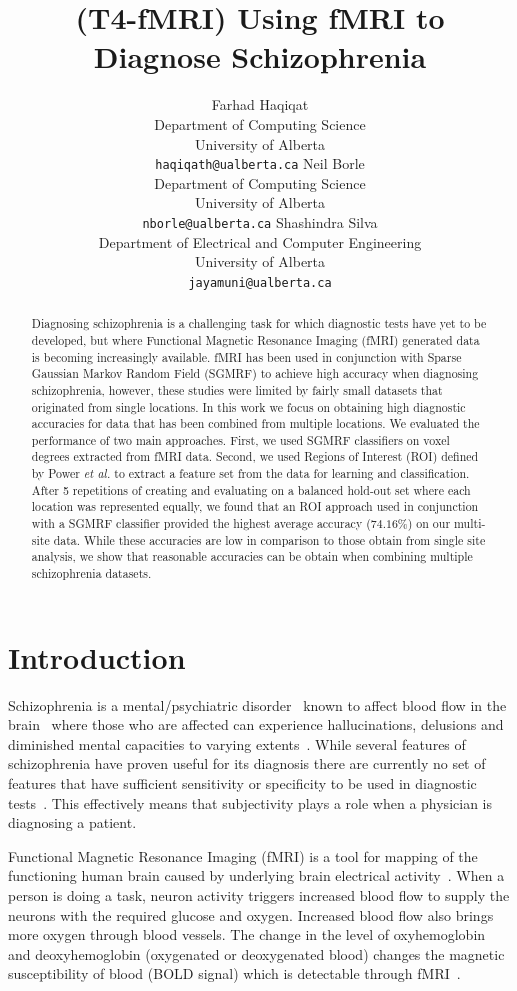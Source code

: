 \documentclass{article} %
\title{(T4-fMRI) Using fMRI to Diagnose Schizophrenia}
\author{
Farhad Haqiqat\\
Department of Computing Science\\
University of Alberta\\
\texttt{haqiqath@ualberta.ca} 
\And 
Neil Borle\\
Department of Computing Science\\
University of Alberta\\
\texttt{nborle@ualberta.ca}
\And 
Shashindra Silva\\
Department of Electrical and Computer Engineering\\
University of Alberta\\
\texttt{jayamuni@ualberta.ca}  
}
\begin{document}
	\maketitle

\begin{abstract}
Diagnosing schizophrenia is a challenging task for which diagnostic tests
have yet to be developed, but where Functional Magnetic Resonance Imaging 
(fMRI) generated data is becoming increasingly available.
fMRI has been used in conjunction with Sparse 
Gaussian Markov Random Field (SGMRF) to achieve high accuracy when diagnosing
schizophrenia, however, these studies were limited by fairly small datasets
that originated from single locations. In this work we focus on obtaining
high diagnostic accuracies for data that has been combined from multiple
locations. We evaluated the performance of two main approaches. First, we 
used SGMRF classifiers on voxel degrees extracted from fMRI data. Second, we 
used Regions of Interest (ROI) defined by Power \emph{et al.} to extract a 
feature set from the data for learning and classification. 
After 5 repetitions of creating and evaluating on a balanced hold-out set where 
each location was represented equally, we found that an ROI approach used in 
conjunction with a SGMRF classifier provided the highest average accuracy 
($74.16\%$) on our multi-site 
data. While these accuracies are low in comparison to those obtain from
single site analysis, we show that reasonable accuracies can be obtain
when combining multiple schizophrenia datasets.
\end{abstract}


\section{Introduction}
Schizophrenia is a mental/psychiatric disorder~\cite{Rish_2013, Kenji_2010} 
known to affect blood flow in the brain~\cite{Kenji_2010} where those who are 
affected can experience hallucinations, delusions and diminished mental 
capacities to varying extents~\cite{jablensky2010diagnostic}. While several
features of schizophrenia have proven useful for its diagnosis there are
currently no set of features that have sufficient sensitivity or specificity
to be used in diagnostic tests~\cite{jablensky2010diagnostic, McGuire200891}. 
This effectively means that subjectivity plays a role when a physician is 
diagnosing a patient. 

Functional Magnetic Resonance Imaging (fMRI) is a tool for mapping of the 
functioning human brain caused by underlying brain electrical 
activity~\cite{fmriMatthews}. When a person is doing a task, neuron activity 
triggers increased blood flow to supply the neurons with 
the required glucose and oxygen\cite{fmriMatthews}. Increased blood flow also 
brings more oxygen through blood vessels. The change in the level of 
oxyhemoglobin and deoxyhemoglobin (oxygenated or deoxygenated blood) changes 
the magnetic susceptibility of blood (BOLD signal) which is detectable through 
fMRI~\cite{fmriMatthews}.
\end{document}
